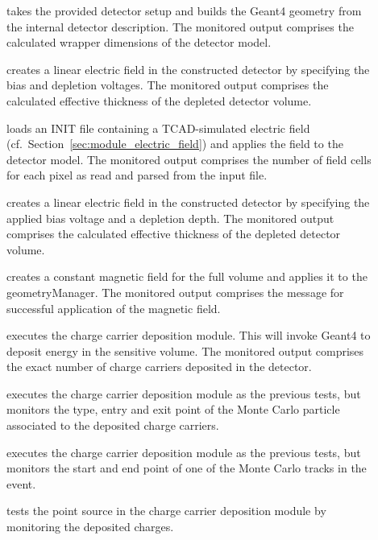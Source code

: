 \begin{description}
    \item[] takes the provided detector setup and builds the Geant4 geometry from the internal detector description. The monitored output comprises the calculated wrapper dimensions of the detector model.
    \item[] creates a linear electric field in the constructed detector by specifying the bias and depletion voltages. The monitored output comprises the calculated effective thickness of the depleted detector volume.
    \item[] loads an INIT file containing a TCAD-simulated electric field (cf.\ Section~\ref{sec:module_electric_field}) and applies the field to the detector model. The monitored output comprises the number of field cells for each pixel as read and parsed from the input file.
    \item[] creates a linear electric field in the constructed detector by specifying the applied bias voltage and a depletion depth. The monitored output comprises the calculated effective thickness of the depleted detector volume.
    \item[] creates a constant magnetic field for the full volume and applies it to the geometryManager. The monitored output comprises the message for successful application of the magnetic field.
    \item[] executes the charge carrier deposition module. This will invoke Geant4 to deposit energy in the sensitive volume. The monitored output comprises the exact number of charge carriers deposited in the detector.
    \item[] executes the charge carrier deposition module as the previous tests, but monitors the type, entry and exit point of the Monte Carlo particle associated to the deposited charge carriers.
    \item[] executes the charge carrier deposition module as the previous tests, but monitors the start and end point of one of the Monte Carlo tracks in the event.
    \item[] tests the point source in the charge carrier deposition module by monitoring the deposited charges.

\end{description}

